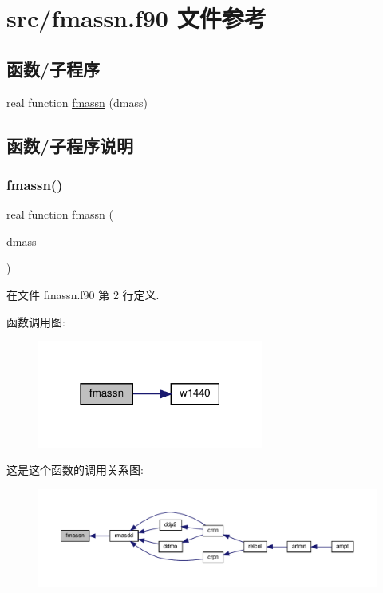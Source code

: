 \hypertarget{fmassn_8f90}{}\section{src/fmassn.f90 文件参考}
\label{fmassn_8f90}
\subsection*{函数/子程序}
\begin{DoxyCompactItemize}
\item 
real function \mbox{\hyperlink{fmassn_8f90_aa4b98a848b078dbc313398c39acc68dc}{fmassn}} (dmass)
\end{DoxyCompactItemize}


\subsection{函数/子程序说明}
\mbox{\label{fmassn_8f90_aa4b98a848b078dbc313398c39acc68dc}} 
\subsubsection{\texorpdfstring{fmassn()}{fmassn()}}
{\footnotesize\ttfamily real function fmassn (\begin{DoxyParamCaption}\item[{}]{dmass }\end{DoxyParamCaption})}



在文件 fmassn.\+f90 第 2 行定义.

函数调用图\+:
\nopagebreak
\begin{figure}[H]
\begin{center}
\leavevmode
\includegraphics[width=210pt]{fmassn_8f90_aa4b98a848b078dbc313398c39acc68dc_cgraph}
\end{center}
\end{figure}
这是这个函数的调用关系图\+:
\nopagebreak
\begin{figure}[H]
\begin{center}
\leavevmode
\includegraphics[width=350pt]{fmassn_8f90_aa4b98a848b078dbc313398c39acc68dc_icgraph}
\end{center}
\end{figure}
